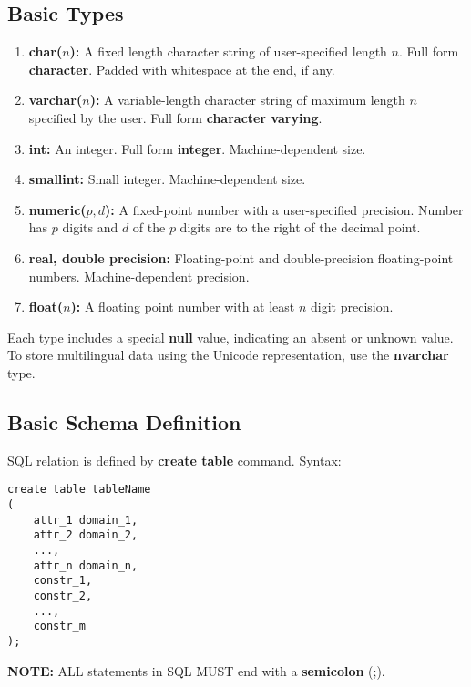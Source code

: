 \documentclass[journal,12pt,twocolumn]{IEEEtran}
\begin{document}
\subsection{Basic Types}
\begin{enumerate}
    \item \textbf{char($n$):} A fixed length character string of user-specified 
    length $n$. Full form \textbf{character}. Padded with whitespace at the end,
    if any.
    \item \textbf{varchar($n$):} A variable-length character string of maximum 
    length $n$ specified by the user. Full form \textbf{character varying}.
    \item \textbf{int:} An integer. Full form \textbf{integer}. Machine-dependent 
    size.
    \item \textbf{smallint:} Small integer. Machine-dependent size.
    \item \textbf{numeric($p, d$):} A fixed-point number with a user-specified 
    precision. Number has $p$ digits and $d$ of the $p$ digits are to the right 
    of the decimal point.
    \item \textbf{real, double precision:} Floating-point and double-precision 
    floating-point numbers. Machine-dependent precision.
    \item \textbf{float($n$):} A floating point number with at least $n$ digit 
    precision.
\end{enumerate}

Each type includes a special \textbf{null} value, indicating an absent or 
unknown value. To store multilingual data using the Unicode representation, use 
the \textbf{nvarchar} type.

\subsection{Basic Schema Definition}

SQL relation is defined by \textbf{create table} command. Syntax:

\begin{lstlisting}
create table tableName
(
    attr_1 domain_1,
    attr_2 domain_2,
    ...,
    attr_n domain_n,
    constr_1,
    constr_2,
    ...,
    constr_m
);
\end{lstlisting}

\textbf{NOTE:} ALL statements in SQL MUST end with a \textbf{semicolon} (;).
\end{document}
